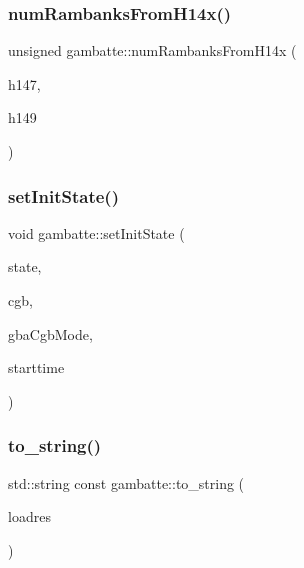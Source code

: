 \mbox{\label{namespacegambatte_a1d7fcd1621b17c908a7ea14dfcb98b10}} 
\subsubsection{\texorpdfstring{num\+Rambanks\+From\+H14x()}{numRambanksFromH14x()}}
{\footnotesize\ttfamily unsigned gambatte\+::num\+Rambanks\+From\+H14x (\begin{DoxyParamCaption}\item[{unsigned char}]{h147,  }\item[{unsigned char}]{h149 }\end{DoxyParamCaption})}

\mbox{\label{namespacegambatte_a3ff886783768784148684a65f48c0b72}} 
\subsubsection{\texorpdfstring{set\+Init\+State()}{setInitState()}}
{\footnotesize\ttfamily void gambatte\+::set\+Init\+State (\begin{DoxyParamCaption}\item[{struct \hyperlink{structgambatte_1_1SaveState}{Save\+State} \&}]{state,  }\item[{bool}]{cgb,  }\item[{bool}]{gba\+Cgb\+Mode,  }\item[{time\+\_\+t}]{starttime }\end{DoxyParamCaption})}

\mbox{\label{namespacegambatte_a81e70a62a5953ed57b464432a55d1441}} 
\subsubsection{\texorpdfstring{to\+\_\+string()}{to\_string()}}
{\footnotesize\ttfamily std\+::string const gambatte\+::to\+\_\+string (\begin{DoxyParamCaption}\item[{\hyperlink{namespacegambatte_a42606f494711d2e2870a5f5cdf69e468}{Load\+Res}}]{loadres }\end{DoxyParamCaption})}

